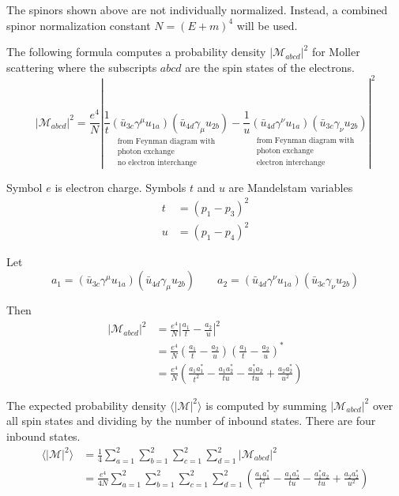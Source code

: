 \documentclass[12pt]{article}
\begin{document}
\noindent
The spinors shown above are not individually normalized.
Instead, a combined spinor normalization constant
$N=(E+m)^4$ will be used.

\bigskip
\noindent
The following formula computes a probability density $|\mathcal{M}_{abcd}|^2$
for Moller scattering where the subscripts $abcd$ are the spin states of the electrons.
\begin{equation*}
|\mathcal{M}_{abcd}|^2=\frac{e^4}{N}
\left|
\underset{\substack{\text{from Feynman diagram with}\\ \text{photon exchange}\\ \text{no electron interchange}}}
{\frac{1}{t}(\bar{u}_{3c}\gamma^\mu u_{1a})(\bar{u}_{4d}\gamma_\mu u_{2b})}
-
\underset{\substack{\text{from Feynman diagram with}\\ \text{photon exchange}\\ \text{electron interchange}}}
{\frac{1}{u}(\bar{u}_{4d}\gamma^\nu u_{1a})(\bar{u}_{3c}\gamma_\nu u_{2b})}
\right|^2
\end{equation*}

\noindent
Symbol $e$ is electron charge.
Symbols $t$ and $u$ are Mandelstam variables
\begin{align*}
t&=(p_1-p_3)^2
\\
u&=(p_1-p_4)^2
\end{align*}

\noindent
Let
\begin{equation*}
a_1=(\bar{u}_{3c}\gamma^\mu u_{1a})(\bar{u}_{4d}\gamma_\mu u_{2b})
\qquad
a_2=(\bar{u}_{4d}\gamma^\nu u_{1a})(\bar{u}_{3c}\gamma_\nu u_{2b})
\end{equation*}

\noindent
Then
\begin{align*}
|\mathcal{M}_{abcd}|^2
&=
\frac{e^4}{N}
\left|\frac{a_1}{t} - \frac{a_2}{u}\right|^2\\
&=
\frac{e^4}{N}
\left(\frac{a_1}{t} - \frac{a_2}{u}\right)\left(\frac{a_1}{t} - \frac{a_2}{u}\right)^*\\
&=
\frac{e^4}{N}
\left(
\frac{a_1a_1^*}{t^2} - \frac{a_1a_2^*}{tu} -
\frac{a_1^*a_2}{tu} + \frac{a_2a_2^*}{u^2}
\right)
\end{align*}

\noindent
The expected probability density $\langle|\mathcal{M}|^2\rangle$ is computed by
summing $|\mathcal{M}_{abcd}|^2$ over all spin states and dividing by the number
of inbound states.
There are four inbound states.
\begin{align*}
\langle|\mathcal{M}|^2\rangle
&=
\frac{1}{4}\sum_{a=1}^2\sum_{b=1}^2\sum_{c=1}^2\sum_{d=1}^2
|\mathcal{M}_{abcd}|^2\\
&=
\frac{e^4}{4N}\sum_{a=1}^2\sum_{b=1}^2\sum_{c=1}^2\sum_{d=1}^2
\left(
\frac{a_1a_1^*}{t^2}-\frac{a_1a_2^*}{tu}-\frac{a_1^*a_2}{tu}+\frac{a_2a_2^*}{u^2}
\right)
\end{align*}
\end{document}
